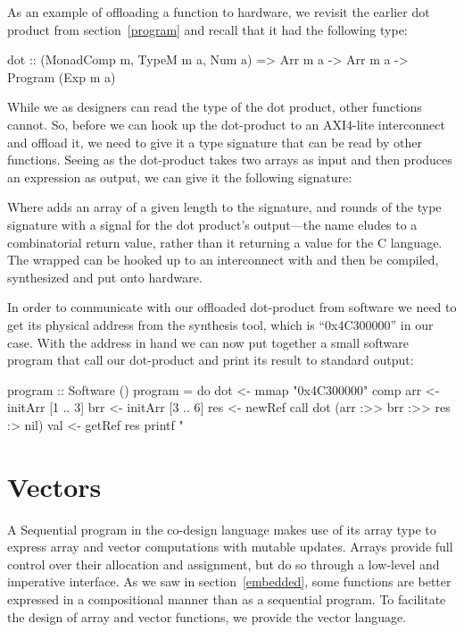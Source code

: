 \documentclass[../paper.tex]{subfiles}
\begin{document}
As an example of offloading a function to hardware, we revisit the earlier dot product from section~\ref{program} and recall that it had the following type:

\begin{code}
dot :: (MonadComp m, TypeM m a, Num a) => Arr m a -> Arr m a
  -> Program (Exp m a)
\end{code}

\noindent While we as designers can read the type of the dot product, other functions cannot. So, before we can hook up the dot-product to an AXI4-lite interconnect and offload it, we need to give it a type signature that can be read by other functions. Seeing as the dot-product takes two arrays as input and then produces an expression as output, we can give it the following signature:


\noindent Where  adds an array of a given length to the signature, and  rounds of the type signature with a signal for the dot product's output---the name eludes to a combinatorial return value, rather than it returning a value for the C language. The wrapped  can be hooked up to an interconnect with  and then be compiled, synthesized and put onto hardware.

In order to communicate with our offloaded dot-product from software we need to get its physical address from the synthesis tool, which is ``0x4C300000'' in our case. With the address in hand we can now put together a small software program that call our dot-product and print its result to standard output:

\begin{code}
program :: Software ()
program = do
  dot <- mmap "0x4C300000" comp
  arr <- initArr [1 .. 3]
  brr <- initArr [3 .. 6]
  res <- newRef
  call dot (arr :>> brr :>> res :> nil)
  val <- getRef res
  printf "%
\end{code}

\section{Vectors}
\label{vectors}

A Sequential program in the co-design language makes use of its array type to express array and vector computations with mutable updates. Arrays provide full control over their allocation and assignment, but do so through a low-level and imperative interface. As we saw in section~\ref{embedded}, some functions are better expressed in a compositional manner than as a sequential program. To facilitate the design of array and vector functions, we provide the vector language. 
\end{document}
